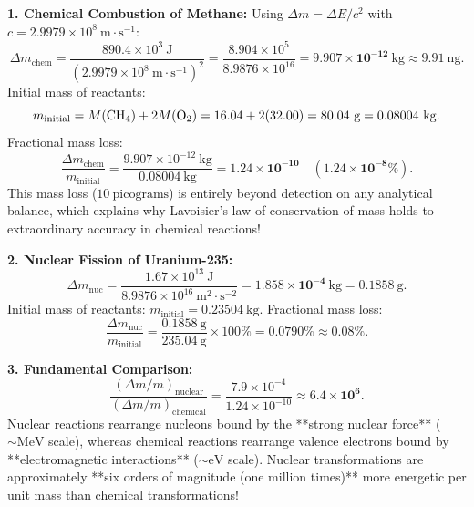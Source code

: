 \begin{solution}
\textbf{1. Chemical Combustion of Methane:}
Using $\Delta m = \Delta E / c^2$ with $c = 2.9979 \times 10^8\ \mathrm{m\cdot s^{-1}}$:
\[
\Delta m_{\text{chem}} = \frac{890.4 \times 10^3\ \mathrm{J}}{(2.9979 \times 10^8\ \mathrm{m\cdot s^{-1}})^2} = \frac{8.904 \times 10^5}{8.9876 \times 10^{16}} = \mathbf{9.907 \times 10^{-12}\ \mathrm{kg}} \approx \mathbf{9.91\ \mathrm{ng}}.
\]
Initial mass of reactants:
\[
m_{\text{initial}} = M(\ce{CH4}) + 2 M(\ce{O2}) = 16.04 + 2(32.00) = 80.04\ \mathrm{g} = 0.08004\ \mathrm{kg}.
\]
Fractional mass loss:
\[
\frac{\Delta m_{\text{chem}}}{m_{\text{initial}}} = \frac{9.907 \times 10^{-12}\ \mathrm{kg}}{0.08004\ \mathrm{kg}} = \mathbf{1.24 \times 10^{-10}} \quad (\mathbf{1.24 \times 10^{-8}\%}).
\]
This mass loss ($10\ \mathrm{picograms}$) is entirely beyond detection on any analytical balance, which explains why Lavoisier's law of conservation of mass holds to extraordinary accuracy in chemical reactions!

\textbf{2. Nuclear Fission of Uranium-235:}
\[
\Delta m_{\text{nuc}} = \frac{1.67 \times 10^{13}\ \mathrm{J}}{8.9876 \times 10^{16}\ \mathrm{m^2\cdot s^{-2}}} = \mathbf{1.858 \times 10^{-4}\ \mathrm{kg}} = \mathbf{0.1858\ \mathrm{g}}.
\]
Initial mass of reactants: $m_{\text{initial}} = 0.23504\ \mathrm{kg}$.
Fractional mass loss:
\[
\frac{\Delta m_{\text{nuc}}}{m_{\text{initial}}} = \frac{0.1858\ \mathrm{g}}{235.04\ \mathrm{g}} \times 100\% = \mathbf{0.0790\%} \approx \mathbf{0.08\%}.
\]

\textbf{3. Fundamental Comparison:}
\[
\frac{(\Delta m / m)_{\text{nuclear}}}{(\Delta m / m)_{\text{chemical}}} = \frac{7.9 \times 10^{-4}}{1.24 \times 10^{-10}} \approx \mathbf{6.4 \times 10^6}.
\]
Nuclear reactions rearrange nucleons bound by the **strong nuclear force** ($\sim \mathrm{MeV}$ scale), whereas chemical reactions rearrange valence electrons bound by **electromagnetic interactions** ($\sim \mathrm{eV}$ scale). Nuclear transformations are approximately **six orders of magnitude (one million times)** more energetic per unit mass than chemical transformations!
\end{solution}

